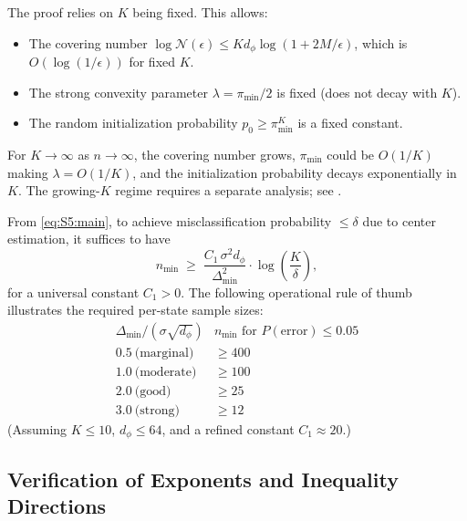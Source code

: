 \begin{remark}
\label{rem:S5:fixedK}
The proof relies on $K$ being fixed.  This allows:
\begin{itemize}
\item The covering number $\log\mathcal{N}(\epsilon)\le
K d_\phi\log(1+2M/\epsilon)$, which is $O(\log(1/\epsilon))$ for fixed $K$.
\item The strong convexity parameter $\lambda=\pi_{\min}/2$ is fixed
(does not decay with $K$).
\item The random initialization probability $p_0\ge\pi_{\min}^K$ is a
fixed constant.
\end{itemize}
For $K\to\infty$ as $n\to\infty$, the covering number grows, $\pi_{\min}$
could be $O(1/K)$ making $\lambda=O(1/K)$, and the initialization
probability decays exponentially in $K$.  The growing-$K$ regime requires
a separate analysis; see \cite{pollard1981strong,lei2013statistical}.
\end{remark}

\begin{remark}
\label{rem:S5:samples}
From \eqref{eq:S5:main}, to achieve misclassification probability
$\le\delta$ due to center estimation, it suffices to have
\[
n_{\min}\;\ge\;
\frac{C_1\,\sigma^2 d_\phi}{\Delta_{\min}^2}
\cdot\log\!\left(\frac{K}{\delta}\right),
\]
for a universal constant $C_1>0$.  The following operational rule of
thumb illustrates the required per-state sample sizes:
\[
\begin{array}{c|c}
\Delta_{\min}/(\sigma\sqrt{d_\phi}) & n_{\min}\text{ for }P(\text{error})\le0.05 \\ \hline
0.5\ \text{(marginal)} & \ge400 \\
1.0\ \text{(moderate)} & \ge100 \\
2.0\ \text{(good)}     & \ge25  \\
3.0\ \text{(strong)}   & \ge12
\end{array}
\]
(Assuming $K\le10$, $d_\phi\le64$, and a refined constant $C_1\approx20$.)
\end{remark}

\subsection{Verification of Exponents and Inequality Directions}
\label{sec:S5:verify}

